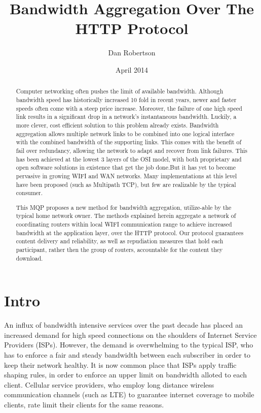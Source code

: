 \documentclass[12pt]{article}
\begin{document}
\title{Bandwidth Aggregation Over The HTTP Protocol}
\author{Dan Robertson}
\date{April 2014}
\maketitle

\begin{abstract}
	Computer networking often pushes the limit of available bandwidth. Although bandwidth speed has historically increased 10 fold in recent years, newer and faster speeds often come with a steep price increase. Moreover, the failure of one high speed link results in a significant drop in a network's instantaneous bandwidth. Luckily, a more clever, cost efficient solution to this problem already exists. Bandwidth aggregation allows multiple network links to be combined into one logical interface with the combined bandwidth of the supporting links. This comes with the benefit of fail over redundancy, allowing the network to adapt and recover from link failures. This has been achieved at the lowest 3 layers of the OSI model, with both proprietary and open software solutions in existence that get the job done.But it has yet to become pervasive in growing WIFI and WAN networks. Many implementations at this level have been proposed (such as Multipath TCP), but few are realizable by the typical consumer.

	This MQP proposes a new method for bandwidth aggregation, utilize-able by the typical home network owner. The methods explained herein aggregate a network of coordinating routers within local WIFI communication range to achieve increased bandwidth at the application layer, over the HTTP protocol. Our protocol guarantees content delivery and reliability, as well as repudiation measures that hold each participant, rather then the group of routers, accountable for the content they download.
\end{abstract}


\newpage
\section{Intro}

	An influx of bandwidth intensive services over the past decade has placed an increased demand for high speed connections on the shoulders of Internet Service Providers (ISPs). However, the demand is overwhelming to the typical ISP, who has to enforce a fair and steady bandwidth between each subscriber in order to keep their network healthy. It is now common place that ISPs apply traffic shaping rules, in order to enforce an upper limit on bandwidth alloted to each client. Cellular service providers, who employ long distance wireless communication channels (such as LTE) to guarantee internet coverage to mobile clients, rate limit their clients for the same reasons. 
\end{document}
